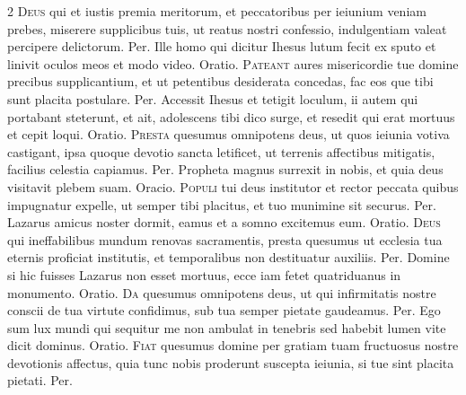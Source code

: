 \begin{multicols*}{2}
\lettrine[lines=2]{\zallmancaps \color{Blue} D}{eus} qui et iustis premia meritorum, et peccatoribus per ieiunium veniam prebes, miserere supplicibus tuis, ut reatus nostri confessio, indulgentiam valeat percipere delictorum. Per.
 Ille homo qui dicitur Ihesus lutum fecit ex sputo et linivit oculos meos et modo video. {\color{Red} Oratio.}
\lettrine[lines=2]{\zallmancaps \color{Red} P}{ateant} aures misericordie tue domine precibus supplicantium, et ut petentibus desiderata concedas, fac eos que tibi sunt placita postulare. Per.
 Accessit Ihesus et tetigit loculum, ii autem qui portabant steterunt, et ait, adolescens tibi dico surge, et resedit qui erat mortuus et cepit loqui. {\color{Red} Oratio.}
\lettrine[lines=2]{\zallmancaps \color{Blue} P}{resta} quesumus omnipotens deus, ut quos ieiunia votiva castigant, ipsa quoque devotio sancta letificet, ut terrenis affectibus mitigatis, facilius celestia capiamus. Per.
 Propheta magnus surrexit in nobis, et quia deus visitavit plebem suam. {\color{Red} Oracio.}
\lettrine[lines=2]{\zallmancaps \color{Red} P}{opuli} tui deus institutor et rector peccata quibus impugnatur expelle, ut semper tibi placitus, et tuo munimine sit securus. Per.
 Lazarus amicus noster dormit, eamus et a somno excitemus eum. {\color{Red} Oratio.}
\lettrine[lines=2]{\zallmancaps \color{Blue} D}{eus} qui ineffabilibus mundum renovas sacramentis, presta quesumus ut ecclesia tua eternis proficiat institutis, et temporalibus non destituatur auxiliis. Per.
 Domine si hic fuisses Lazarus non esset mortuus, ecce iam fetet quatriduanus in monumento. {\color{Red} Oratio.}
\lettrine[lines=2]{\zallmancaps \color{Red} D}{a} quesumus omnipotens deus, ut qui infirmitatis nostre conscii de tua virtute confidimus, sub tua semper pietate gaudeamus. Per.
 Ego sum lux mundi qui sequitur me non ambulat in tenebris sed habebit lumen vite dicit dominus. {\color{Red} Oratio.}
\lettrine[lines=2]{\zallmancaps \color{Blue} F}{iat} quesumus domine per gratiam tuam fructuosus nostre devotionis affectus, quia tunc nobis proderunt suscepta ieiunia, si tue sint placita pietati. Per.
{\color{Red} }

\end{multicols*}
